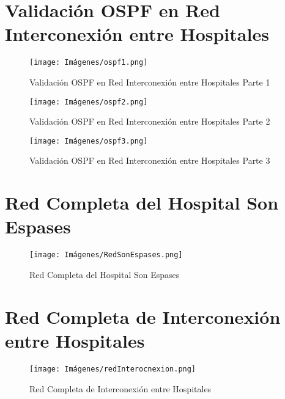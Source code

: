 \section{Validación OSPF en Red Interconexión entre Hospitales}\label{anexo:ospfinter}
\begin{figure}[H]
    \centering
    \texttt{[image: Imágenes/ospf1.png]}
    \caption{Validación OSPF en Red Interconexión entre Hospitales Parte 1}
\end{figure}
\begin{figure}[H]
    \centering
    \texttt{[image: Imágenes/ospf2.png]}
    \caption{Validación OSPF en Red Interconexión entre Hospitales Parte 2}
\end{figure}
\begin{figure}[H]
    \centering
    \texttt{[image: Imágenes/ospf3.png]}
    \caption{Validación OSPF en Red Interconexión entre Hospitales Parte 3}
\end{figure}

\section{Red Completa del Hospital Son Espases}\label{anexo:redcompletasonespas}
\begin{figure}[H]
    \centering
    \texttt{[image: Imágenes/RedSonEspases.png]}
    \caption{Red Completa del Hospital Son Espases}
    \label{fig:SonEspases}
\end{figure}
\section{Red Completa de Interconexión entre Hospitales}\label{anexo:redcompletahosp}
\begin{figure}[H]
    \centering
    \texttt{[image: Imágenes/redInterocnexion.png]}
    \caption{Red Completa de Interconexión entre Hospitales}
    \label{fig:interconexion}
\end{figure}

